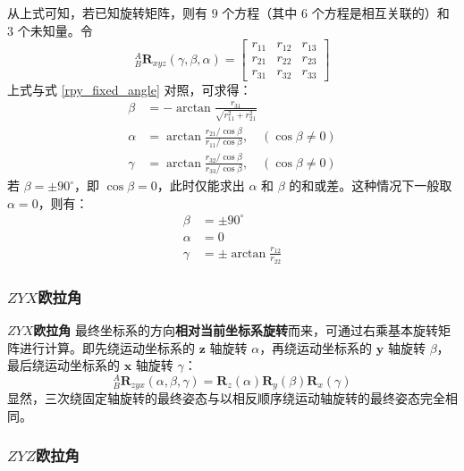 \documentclass[cn,11pt,chinese,blue,bibstyle=ieeetr]{elegantbook}
\begin{document}
从上式可知，若已知旋转矩阵，则有 $9$ 个方程（其中 $6$ 个方程是相互关联的）和 $3$ 个未知量。令
\begin{equation}
	_B^A\bm{R}_{xyz}\left(\gamma, \beta, \alpha\right) =
	\begin{bmatrix}
		r_{11} & r_{12} & r_{13} \\
		r_{21} & r_{22} & r_{23} \\
		r_{31} & r_{32} & r_{33}
	\end{bmatrix}
\end{equation}
上式与式 \ref{rpy_fixed_angle} 对照，可求得：
\begin{equation}
	\begin{aligned}
		\beta &= -\arctan\frac{r_{31}}{\sqrt{r_{11}^2+r_{21}^2}} \\
		\alpha &= \arctan\frac{r_{21}/\cos\beta}{r_{11}/\cos\beta}, \quad (\cos\beta \ne 0) \\
		\gamma &= \arctan\frac{r_{32}/\cos\beta}{r_{33}/\cos\beta}, \quad (\cos\beta \ne 0)
	\end{aligned}
\end{equation}
若 $\beta = \pm 90^{\circ}$，即 $\cos\beta = 0$，此时仅能求出 $\alpha$ 和 $\beta$ 的和或差。这种情况下一般取 $\alpha = 0$，则有：
\begin{equation}
	\begin{aligned}
		\beta &= \pm 90^{\circ} \\
		\alpha &= 0 \\
		\gamma &= \pm \arctan\frac{r_{12}}{r_{22}}
	\end{aligned}
\end{equation}


\subsubsection{\textbf{$ZYX$}欧拉角}

\textbf{$ZYX$欧拉角} 最终坐标系的方向\textbf{相对当前坐标系旋转}而来，可通过右乘基本旋转矩阵进行计算。即先绕运动坐标系的 $\bm{z}$ 轴旋转 $\alpha$，再绕运动坐标系的 $\bm{y}$ 轴旋转 $\beta$，最后绕运动坐标系的 $\bm{x}$ 轴旋转 $\gamma$：
\begin{equation}
	_B^A\bm{R}_{zyx}\left(\alpha, \beta, \gamma\right) = \bm{R}_z\left(\alpha\right) \bm{R}_y\left(\beta\right) \bm{R}_x\left(\gamma\right)
\end{equation}
显然，三次绕固定轴旋转的最终姿态与以相反顺序绕运动轴旋转的最终姿态完全相同。


\subsubsection{\textbf{$ZYZ$}欧拉角}
\end{document}
